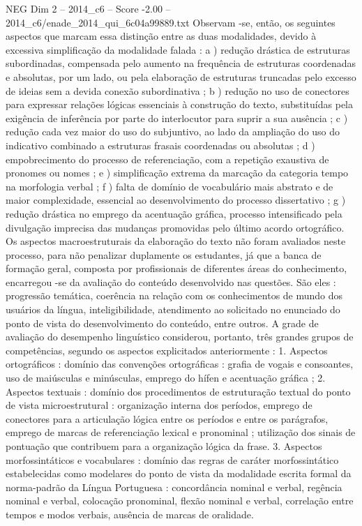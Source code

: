 \begin{textsample}{NEG Dim 2 – 2014\_c6 – Score -2.00 – 2014\_c6/enade\_2014\_qui\_6c04a99889.txt}
Observam -se, então, os seguintes aspectos que marcam essa distinção entre as duas modalidades, devido à excessiva simplificação da modalidade falada : a ) redução drástica de estruturas subordinadas, compensada pelo aumento na frequência de estruturas coordenadas e absolutas, por um lado, ou pela elaboração de estruturas truncadas pelo excesso de ideias sem a devida conexão subordinativa ; b ) redução no uso de conectores para expressar relações lógicas essenciais à construção do texto, substituídas pela exigência de inferência por parte do interlocutor para suprir a sua ausência ; c ) redução cada vez maior do uso do subjuntivo, ao lado da ampliação do uso do indicativo combinado a estruturas frasais coordenadas ou absolutas ; d ) empobrecimento do processo de referenciação, com a repetição exaustiva de pronomes ou nomes ; e ) simplificação extrema da marcação da categoria tempo na morfologia verbal ; f ) falta de domínio de vocabulário mais abstrato e de maior complexidade, essencial ao desenvolvimento do processo dissertativo ; g ) redução drástica no emprego da acentuação gráfica, processo intensificado pela divulgação imprecisa das mudanças promovidas pelo último acordo ortográfico.
Os aspectos macroestruturais da elaboração do texto não foram avaliados neste processo, para não penalizar duplamente os estudantes, já que a banca de formação geral, composta por profissionais de diferentes áreas do conhecimento, encarregou -se da avaliação do conteúdo desenvolvido nas questões.
São eles : progressão temática, coerência na relação com os conhecimentos de mundo dos usuários da língua, inteligibilidade, atendimento ao solicitado no enunciado do ponto de vista do desenvolvimento do conteúdo, entre outros.
A grade de avaliação do desempenho linguístico considerou, portanto, três grandes grupos de competências, segundo os aspectos explicitados anteriormente : 1.
Aspectos ortográficos : domínio das convenções ortográficas : grafia de vogais e consoantes, uso de maiúsculas e minúsculas, emprego do hífen e acentuação gráfica ; 2.
Aspectos textuais : domínio dos procedimentos de estruturação textual do ponto de vista microestrutural : organização interna dos períodos, emprego de conectores para a articulação lógica entre os períodos e entre os parágrafos, emprego de marcas de referenciação lexical e pronominal ; utilização dos sinais de pontuação que contribuem para a organização lógica da frase. 3.
Aspectos morfossintáticos e vocabulares : domínio das regras de caráter morfossintático estabelecidas como modelares do ponto de vista da modalidade escrita formal da norma-padrão da Língua Portuguesa : concordância nominal e verbal, regência nominal e verbal, colocação pronominal, flexão nominal e verbal, correlação entre tempos e modos verbais, ausência de marcas de oralidade.

\end{textsample}
